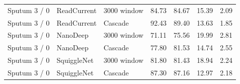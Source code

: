 \begin{longtable}{lllllll}
Sputum 3 / 0 & ReadCurrent & 3000 window & 84.73 & 84.67 & 15.39 & 2.09\\
Sputum 3 / 0 & ReadCurrent & Cascade & 92.43 & 89.40 & 13.63 & 1.85\\
Sputum 3 / 0 & NanoDeep & 3000 window & 71.11 & 75.56 & 19.99 & 2.81\\
Sputum 3 / 0 & NanoDeep & Cascade & 77.80 & 81.53 & 14.74 & 2.55\\
Sputum 3 / 0 & SquiggleNet & 3000 window & 81.80 & 81.43 & 18.94 & 2.24\\
Sputum 3 / 0 & SquiggleNet & Cascade & 87.30 & 87.16 & 12.97 & 2.18\\
\end{longtable}
